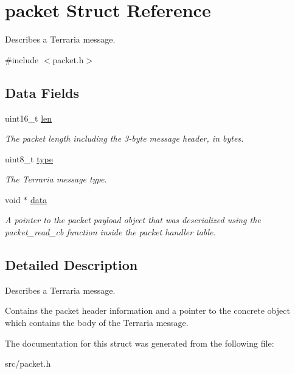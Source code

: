 \hypertarget{structpacket}{}\section{packet Struct Reference}
\label{structpacket}


Describes a Terraria message.  




{\ttfamily \#include $<$packet.\+h$>$}

\subsection*{Data Fields}
\begin{DoxyCompactItemize}
\item 
\hypertarget{group__packet_ga7b613bc0cf0d706a0c825dadfc6840d2}{}uint16\+\_\+t \hyperlink{group__packet_ga7b613bc0cf0d706a0c825dadfc6840d2}{len}\label{group__packet_ga7b613bc0cf0d706a0c825dadfc6840d2}

\begin{DoxyCompactList}\small\item\em The packet length including the 3-\/byte message header, in bytes. \end{DoxyCompactList}\item 
\hypertarget{group__packet_ga53b4fdec86403ff886583182dfae176e}{}uint8\+\_\+t \hyperlink{group__packet_ga53b4fdec86403ff886583182dfae176e}{type}\label{group__packet_ga53b4fdec86403ff886583182dfae176e}

\begin{DoxyCompactList}\small\item\em The Terraria message type. \end{DoxyCompactList}\item 
\hypertarget{group__packet_gad3115ffc58cc55bae08635ed965c4768}{}void $\ast$ \hyperlink{group__packet_gad3115ffc58cc55bae08635ed965c4768}{data}\label{group__packet_gad3115ffc58cc55bae08635ed965c4768}

\begin{DoxyCompactList}\small\item\em A pointer to the packet payload object that was deserialized using the {\ttfamily packet\+\_\+read\+\_\+cb} function inside the packet handler table. \end{DoxyCompactList}\end{DoxyCompactItemize}


\subsection{Detailed Description}
Describes a Terraria message. 

Contains the packet header information and a pointer to the concrete object which contains the body of the Terraria message. 

The documentation for this struct was generated from the following file\+:\begin{DoxyCompactItemize}
\item 
src/packet.\+h\end{DoxyCompactItemize}
